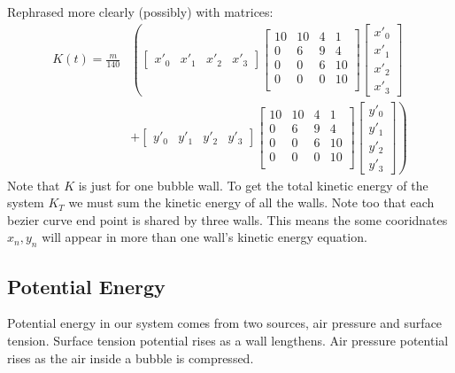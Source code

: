 \documentclass{article}
\begin{document}
Rephrased more clearly (possibly) with matrices:
\begin{align*}
K(t)=
\frac{m}{140} &\left(
\begin{bmatrix} x'_0 & x'_1 & x'_2 & x'_3 \end{bmatrix}
 \begin{bmatrix} 
10 & 10 & 4 & 1\\
0 & 6 & 9 & 4\\
0 & 0 & 6 & 10\\
0 & 0 & 0 & 10\\ 
\end{bmatrix}
\begin{bmatrix} x'_0\\x'_1\\x'_2\\x'_3 \end{bmatrix}
\right.\\
&+ \left.
\begin{bmatrix} y'_0 & y'_1 & y'_2 & y'_3 \end{bmatrix}
 \begin{bmatrix} 
10 & 10 & 4 & 1\\
0 & 6 & 9 & 4\\
0 & 0 & 6 & 10\\
0 & 0 & 0 & 10\\ 
\end{bmatrix}
\begin{bmatrix} y'_0\\y'_1\\y'_2\\y'_3 \end{bmatrix} 
\right)
\end{align*}
Note that $K$ is just for one bubble wall. To get the total
kinetic energy of the system $K_T$ we must sum the kinetic energy of all the
walls. Note too that each bezier curve end point is shared by three walls. This
means the some cooridnates $x_n, y_n$ will appear in more than one wall's kinetic energy equation.
\subsection{Potential Energy}
Potential energy in our system comes from two sources, air pressure and surface
tension. Surface tension potential rises as a wall lengthens.
Air pressure potential rises as the air inside a bubble is compressed.
\end{document}
